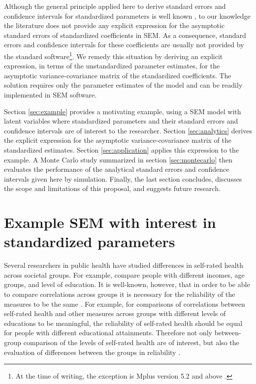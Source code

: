 \documentclass[a4paper,11pt]{article}
\newcommand{\0}{\boldsymbol{0}}
\begin{document}
Although the general principle applied here to derive standard errors and confidence intervals for standardized parameters is well known  \citep[e.g.][]{oehlert1992note}, to our knowledge the literature does not provide any explicit expression for the asymptotic standard errors of standardized coefficients in SEM. As a consequence, standard errors and confidence intervals for these coefficients are usually not provided by the standard software\footnote{At the time of writing, the exception is Mplus version 5.2 and above \citep{muthen1998mplus}.}.  We remedy this situation by deriving an explicit expression, in terms of the unstandardized parameter estimates, for the asymptotic variance-covariance matrix of the standardized coefficients. The solution requires only the parameter estimates of the model and can be readily implemented in SEM software.

Section \ref{sec:example}  provides a motivating example, using a SEM model with latent
variables where standardized parameters and their standard errors and confidence
intervals are of interest to the researcher.
Section \ref{sec:analytics} derives the explicit expression for the asymptotic variance-covariance matrix of the standardized estimates. Section \ref{sec:application} applies this expression to the example. A Monte Carlo study summarized in section \ref{sec:montecarlo}
then evaluates the performance of the analytical standard errors and confidence intervals given here 
by simulation.
Finally, the last section concludes, discusses the scope and limitations of this proposal, and suggests future research.


\section{Example SEM with interest in standardized parameters\label{sec:example}}


Several researchers in public health have studied differences  in self-rated health across societal groups.   For example,  \cite{von2006education} 
compare people with different incomes, age groups, and level of education.
It is well-known, however, that in order to be able to compare correlations across groups it is necessary for the reliability of 
the measures to be the same \citep[e.g.][]{steenkamp1998assessing,saris_design_2007}. 
For example, for comparisons of correlations between self-rated health and other measures
across groups with different levels of educations to be meaningful, the reliability
of self-rated health should be equal for people with different educational attainments.
Therefore not only between-group comparison of the levels of self-rated health are of interest, 
but also the evaluation of differences between the groups in reliability \citep{lundberg1996assessing}. 
\end{document}
